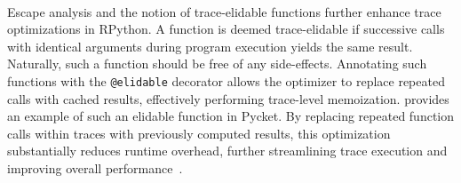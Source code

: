         \paragraph{}%
            Escape analysis and the notion of trace-elidable functions further enhance trace optimizations in RPython. A function is deemed trace-elidable if successive calls with identical arguments during program execution yields the same result. Naturally, such a function should be free of any side-effects. Annotating such functions with the \texttt{@elidable} decorator allows the optimizer to replace repeated calls with cached results, effectively performing trace-level memoization.  provides an example of such an elidable function in Pycket. By replacing repeated function calls within traces with previously computed results, this optimization substantially reduces runtime overhead, further streamlining trace execution and improving overall performance~\cite{bolzPhDThesis}.
